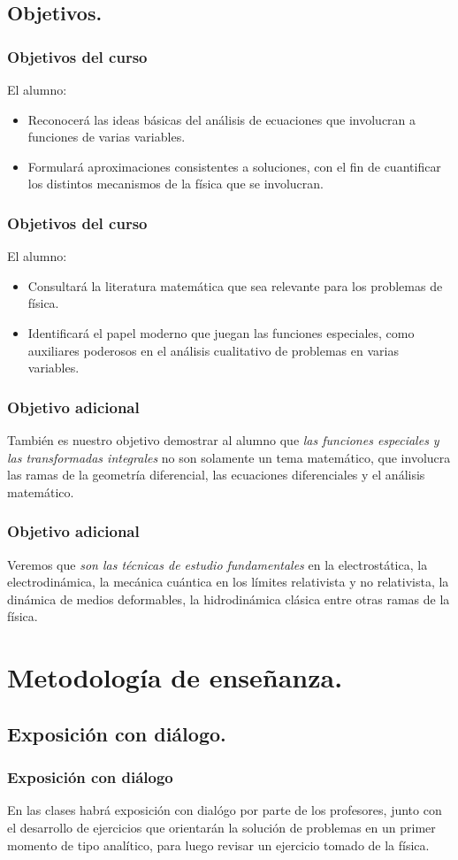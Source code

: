 \subsection{Objetivos.}
\begin{frame}
\frametitle{Objetivos del curso}
El alumno:
\begin{itemize}
\setlength{\itemsep}{0mm}
\item Reconocerá las ideas básicas del análisis de ecuaciones que involucran a funciones de varias variables.
\item Formulará aproximaciones consistentes a soluciones, con el fin de cuantificar los distintos mecanismos de la física que se involucran.
\end{itemize}
\end{frame}
\begin{frame}
\frametitle{Objetivos del curso}
El alumno:
\begin{itemize}
\setlength{\itemsep}{0mm}
\item Consultará la literatura matemática que sea relevante para los problemas de física.
\item Identificará el papel moderno que juegan las funciones especiales, como auxiliares poderosos en el análisis cualitativo de problemas en varias variables.
\end{itemize}
\end{frame}
\begin{frame}
\frametitle{Objetivo adicional}
También es nuestro objetivo demostrar al alumno que \emph{las funciones especiales y las transformadas integrales} no son solamente un tema matemático, que involucra las ramas de la geometría diferencial, las ecuaciones diferenciales y el análisis matemático.
\end{frame}
\begin{frame}
\frametitle{Objetivo adicional}
Veremos que \emph{son las técnicas de estudio fundamentales} en la electrostática, la electrodinámica, la mecánica cuántica en los límites relativista y no relativista, la dinámica de medios deformables, la hidrodinámica clásica entre otras ramas de la física.
\end{frame}
\section{Metodología de enseñanza.}
\subsection{Exposición con diálogo.}
\begin{frame}
\frametitle{Exposición con diálogo}
En las clases habrá exposición con dialógo por parte de los profesores, junto con el desarrollo de ejercicios que orientarán la solución de problemas en un primer momento de tipo analítico, para luego revisar un ejercicio tomado de la física.
\end{frame}
